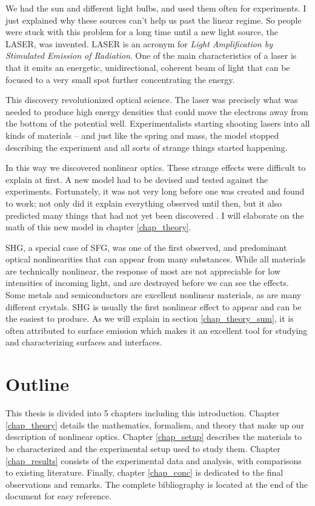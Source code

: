 We had the sun and different light bulbs, and used them often for experiments. I just explained why these sources can't help us past the linear regime. So people were stuck with this problem for a long time until a new light source, the LASER, was invented. LASER is an acronym for \emph{Light Amplification by Stimulated Emission of Radiation}. One of the main characteristics of a laser is that it emits an energetic, unidirectional, coherent beam of light that can be focused to a very small spot further concentrating the energy.

This discovery revolutionized optical science. The laser was precisely what was needed to produce high energy densities that could move the electrons away from the bottom of the potential well. Experimentalists starting shooting lasers into all kinds of materials -- and just like the spring and mass, the model stopped describing the experiment and all sorts of strange things started happening.

In this way we discovered nonlinear optics. These strange effects were difficult to explain at first. A new model had to be devised and tested against the experiments. Fortunately, it was not very long before one was created and found to work; not only did it explain everything observed until then, but it also predicted many things that had not yet been discovered \cite{boyd2003nonlinear, diels2006ultrashort, shen1984principles}. I will elaborate on the math of this new model in chapter \ref{chap_theory}.

SHG, a special case of SFG, was one of the first observed, and predominant optical nonlinearities that can appear from many substances. While all materials are technically nonlinear, the response of most are not appreciable for low intensities of incoming light, and are destroyed before we can see the effects. Some metals and semiconductors are excellent nonlinear materials, as are many different crystals. SHG is usually the first nonlinear effect to appear and can be the easiest to produce. As we will explain in section \ref{chap_theory_sum}, it is often attributed to surface emission which makes it an excellent tool for studying and characterizing surfaces and interfaces.

\section{Outline}
This thesis is divided into 5 chapters including this introduction. Chapter \ref{chap_theory} details the mathematics, formalism, and theory that make up our description of nonlinear optics. Chapter \ref{chap_setup} describes the materials to be characterized and the experimental setup used to study them. Chapter \ref{chap_results} consists of the experimental data and analysis, with comparisons to existing literature. Finally, chapter \ref{chap_conc} is dedicated to the final observations and remarks. The complete bibliography is located at the end of the document for easy reference.
